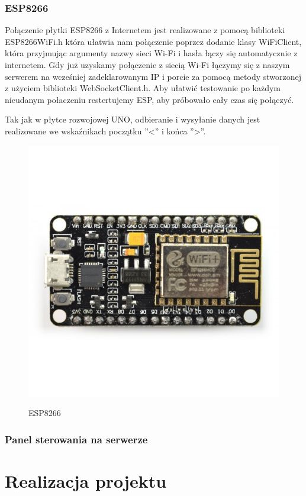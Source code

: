 \documentclass[12pt]{article}
\begin{document}
\subsubsection{ESP8266}
Połączenie płytki ESP8266 z Internetem jest realizowane z pomocą biblioteki ESP8266WiFi.h która ułatwia nam połączenie poprzez dodanie klasy WiFiClient, która przyjmując argumenty nazwy sieci Wi-Fi i hasła łączy się automatycznie z internetem.
Gdy już uzyskamy połączenie z siecią Wi-Fi łączymy się z naszym serwerem na wcześniej zadeklarowanym IP i porcie za pomocą metody stworzonej z użyciem biblioteki WebSocketClient.h.
Aby ułatwić testowanie po każdym nieudanym połaczeniu restertujemy ESP, aby próbowało cały czas się połączyć.

Tak jak w płytce rozwojowej UNO, odbieranie i wysyłanie danych jest realizowane we wskaźnikach początku ''<'' i końca ''>''.
\begin{figure}[!h]
	\begin{center}
		{\includegraphics[width=12cm]{esp8266_photo.png}}
	\end{center}
	\caption{ESP8266}
\end{figure}
\subsubsection{Panel sterowania na serwerze}

\section{Realizacja projektu}
\end{document}
